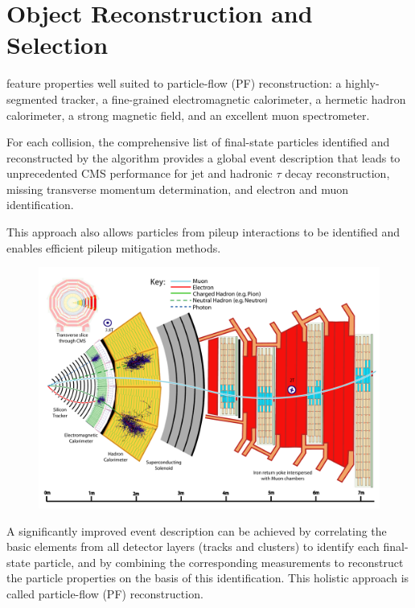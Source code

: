\chapter{Object Reconstruction and Selection}

feature properties well suited to particle-flow (PF) reconstruction: a highly-segmented tracker, a fine-grained electromagnetic calorimeter, a hermetic hadron calorimeter, a strong magnetic field, and an excellent muon spectrometer.

For each collision, the comprehensive list of final-state particles identified and reconstructed by the algorithm provides a global event description that leads to unprecedented CMS performance for jet and hadronic $\tau$ decay reconstruction, missing transverse momentum determination, and electron and muon identification.

This approach also allows particles from pileup interactions to be identified and enables efficient pileup mitigation methods.


\begin{figure}[htbp]
\centering
     \includegraphics[width=1.0\textwidth]{object_reconstruction_and_selection/plots/cms_slice.pdf}
     \caption{
     }
     \label{fig:cms_slice}
\end{figure}

A significantly improved event description can be achieved by correlating the basic elements from all detector layers (tracks and clusters) to identify each final-state particle, and by combining the corresponding measurements to reconstruct the particle properties on the basis of this identification. This holistic approach is called particle-flow (PF) reconstruction.

